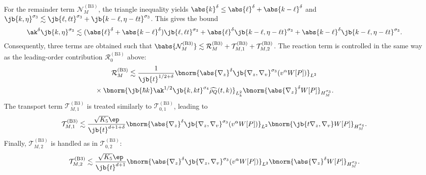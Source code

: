 For the remainder term $\mathcal{N}_M^{\mathrm{(B3)}}$, the triangle inequality yields $\abs{k}^\delta\leq \abs{\ell }^\delta+\abs{k-\ell }^{\delta}$ and $\jb{k,\eta}^{\sigma_3}\lesssim\jb{\ell ,\ell t}^{\sigma_3}+\jb{k-\ell ,\eta-\ell t}^{\sigma_3}$. This gives the bound
\begin{align*}
\ak^\delta\jb{k,\eta}^{\sigma_3}\lesssim(\abs{\ell }^{\delta}+\abs{k-\ell }^{\delta})\jb{\ell,\ell t}^{\sigma_3}+\abs{\ell }^\delta\jb{k-\ell ,\eta-\ell t}^{\sigma_3}+\abs{k-\ell }^{\delta}\jb{k-\ell ,\eta-\ell t}^{\sigma_3}.
\end{align*}Consequently, three terms are obtained such that $\babs{\mathcal{N}_M^{\mathrm{(B3)}}}\lesssim \mathcal{R}_M^{\mathrm{(B3)}}+\mathcal{T}_{M,1}^{\mathrm{(B3)}}+\mathcal{T}_{M,2}^{\mathrm{(B3)}}$.
The reaction term is controlled in the same way as the leading-order contribution $\mathcal{R}_0^{\mathrm{(B3)}}$ above:
\begin{multline*}
\mathcal{R}_M^{\mathrm{(B3)}}\lesssim\frac{1}{\jb{t}^{1/2+\delta}}\bnorm{\abs{\nabla_z}^\delta\jb{\nabla_z,\nabla_v}^{\sigma_3}(v^\alpha W[P])}_{L^2}\\
{}\times\bnorm{\jb{\hbar k}\ak^{1/2}\jb{k,kt}^{\sigma_4}\widehat{\rho_Q}(t,k)}_{L^2_k}\bnorm{\abs{\nabla_z}^\delta W[P]}_{H^{\sigma_3}_M}.
\end{multline*}
The transport term $\mathcal{T}_{M,1}^{\mathrm{(B3)}}$ is treated similarly to $\mathcal{T}_{0,1}^{\mathrm{(B3)}}$, leading to
\begin{align*}
\mathcal{T}_{M,1}^{\mathrm{(B3)}}\lesssim\frac{\sqrt{K_5}\ep}{\jb{t}^{d+1+\delta}}\bnorm{\abs{\nabla_z}^\delta\jb{\nabla_z,\nabla_v}^{\sigma_3}(v^\alpha W[P])}_{L^2}\bnorm{\jb{t\nabla_z,\nabla_v}W[P]}_{H^{\sigma_4}_M}.
\end{align*}Finally, $\mathcal{T}_{M,2}^{\mathrm{(B3)}}$ is handled as in $\mathcal{T}_{0,2}^{\mathrm{(B3)}}$:
\begin{align*}
\mathcal{T}_{M,2}^{\mathrm{(B3)}}\lesssim\frac{\sqrt{K_5}\ep}{\jb{t}^{d+1}}\bnorm{\abs{\nabla_z}^\delta\jb{\nabla_z,\nabla_v}^{\sigma_3}(v^\alpha W[P])}_{L^2}\bnorm{\abs{\nabla_z}^\delta W[P]}_{H^{\sigma_3}_M}.
\end{align*}

